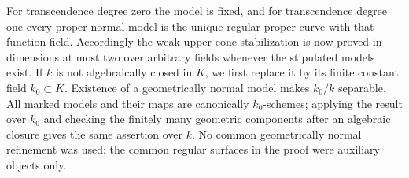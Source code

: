 \begin{remark}
For transcendence degree zero the model is fixed, and for
transcendence degree one every proper normal model is the unique
regular proper curve with that function field.  Accordingly the
weak upper-cone stabilization is now proved in dimensions at most
two over arbitrary fields whenever the stipulated models exist.
If $k$ is not algebraically closed in $K$, we first replace it by
its finite constant field $k_0\subset K$.  Existence of a
geometrically normal model makes $k_0/k$ separable.  All marked
models and their maps are canonically $k_0$-schemes; applying the
result over $k_0$ and checking the finitely many geometric
components after an algebraic closure gives the same assertion
over $k$.
No common geometrically normal refinement was used: the common
regular surfaces in the proof were auxiliary objects only.
\end{remark}
